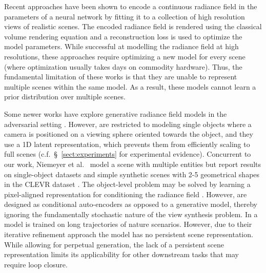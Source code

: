 \documentclass[10pt,twocolumn,letterpaper]{article}
\begin{document}
Recent approaches \cite{nsvf,nerf,derf,fvs,svs} have been shown to encode a continuous radiance field in the parameters of a neural network by fitting it to a collection of high resolution views of realistic scenes. The encoded radiance field is rendered using the classical volume rendering equation \cite{volumerendering} and a reconstruction loss is used to optimize the model parameters. While successful at modelling the radiance field at high resolutions, these approaches require optimizing a new model for every scene (where optimization usually takes days on commodity hardware). Thus, the fundamental limitation of these works is that they are unable to represent multiple scenes within the same model. As a result, these models cannot learn a prior distribution over multiple scenes.

Some newer works have explore generative radiance field models in the adversarial setting \cite{pigan,giraffe,graf}.
However, \cite{pigan,graf} are restricted to modeling single objects where a camera is positioned on a viewing sphere oriented towards the object, and they use a 1D latent representation, which prevents them from efficiently scaling to full scenes (c.f.~\S~\ref{sect:experiments} for experimental evidence). Concurrent to our work, Niemeyer et al.~\cite{giraffe} model a scene with multiple entities but report results on single-object datasets and simple synthetic scenes with 2-5 geometrical shapes in the CLEVR dataset \cite{clevr}. The object-level problem may be solved by learning a pixel-aligned representation for conditioning the radiance field \cite{grf,pixelnerf,sharf,ibrnet}. However, \cite{grf,pixelnerf,sharf,ibrnet} are designed as conditional auto-encoders as opposed to a generative model, thereby ignoring the fundamentally stochastic nature of the view synthesis problem. In \cite{infinitenature} a model is trained on long trajectories of nature scenarios. However, due to their iterative refinement approach the model has no persistent scene representation. While allowing for perpetual generation, the lack of a persistent scene representation limits its applicability for other downstream tasks that may require loop closure. 
\end{document}
